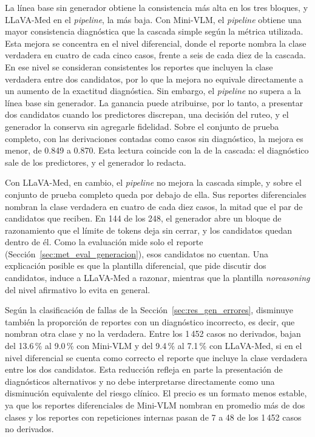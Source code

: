 La línea base sin generador obtiene la consistencia más alta en los tres bloques, y LLaVA-Med en el \emph{pipeline},
la más baja. Con Mini-VLM, el \emph{pipeline} obtiene una mayor consistencia diagnóstica que la cascada simple según la métrica utilizada. Esta mejora se concentra en el nivel diferencial, donde el reporte nombra la clase verdadera en cuatro de cada cinco casos, frente a seis de cada diez de la cascada. En ese nivel se consideran consistentes los reportes que incluyen la clase verdadera entre dos candidatos, por lo que la mejora no equivale directamente a un aumento de la exactitud diagnóstica. Sin embargo, el \emph{pipeline} no supera a la línea base sin generador. La ganancia puede atribuirse, por lo tanto, a presentar dos candidatos cuando los predictores discrepan, una decisión del ruteo, y el generador la
conserva sin agregarle fidelidad. Sobre el conjunto de prueba completo, con las derivaciones contadas como casos sin diagnóstico,
la mejora es menor, de 0.849 a 0.870. Esta lectura coincide con la de la cascada: el diagnóstico sale de los
predictores, y el generador lo redacta.

Con LLaVA-Med, en cambio, el \emph{pipeline} no mejora la cascada simple, y sobre el conjunto de prueba completo queda por debajo de
ella. Sus reportes diferenciales nombran la clase verdadera en cuatro de cada diez casos, la mitad que el par de
candidatos que reciben. En 144 de los 248, el generador abre un bloque de razonamiento que el límite de tokens deja sin
cerrar, y los candidatos quedan dentro de él. Como la evaluación mide solo el reporte
(Sección~\ref{sec:met_eval_generacion}), esos candidatos no cuentan. Una explicación posible es que la plantilla
diferencial, que pide discutir dos candidatos, induce a LLaVA-Med a razonar, mientras que la plantilla
\emph{noreasoning} del nivel afirmativo lo evita en general.

Según la clasificación de fallas de la Sección~\ref{sec:res_gen_errores}, disminuye también la proporción de reportes con un diagnóstico incorrecto, es decir, que nombran otra clase y no la verdadera. Entre los 1\,452 casos no derivados, bajan del 13.6\,\% al 9.0\,\% con Mini-VLM y del 9.4\,\% al 7.1\,\% con LLaVA-Med, si en el nivel diferencial se cuenta como
correcto el reporte que incluye la clase verdadera entre los dos candidatos. Esta reducción refleja en parte la presentación de diagnósticos alternativos y no debe interpretarse directamente como una disminución equivalente del riesgo clínico. El precio es un formato menos estable, ya que
los reportes diferenciales de Mini-VLM nombran en promedio más de dos clases y los reportes con repeticiones internas pasan de 7 a 48 de los 1\,452 casos no derivados.

